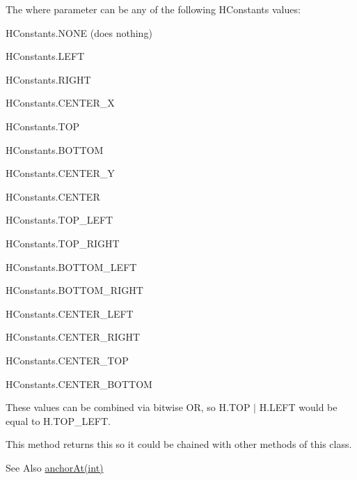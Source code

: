 The {\ttfamily where} parameter can be any of the following H\-Constants values\-:
\begin{DoxyItemize}
\item {\ttfamily H\-Constants.\-N\-O\-N\-E} (does nothing)
\item {\ttfamily H\-Constants.\-L\-E\-F\-T}
\item {\ttfamily H\-Constants.\-R\-I\-G\-H\-T}
\item {\ttfamily H\-Constants.\-C\-E\-N\-T\-E\-R\-\_\-\-X}
\item {\ttfamily H\-Constants.\-T\-O\-P}
\item {\ttfamily H\-Constants.\-B\-O\-T\-T\-O\-M}
\item {\ttfamily H\-Constants.\-C\-E\-N\-T\-E\-R\-\_\-\-Y}
\item {\ttfamily H\-Constants.\-C\-E\-N\-T\-E\-R}
\item {\ttfamily H\-Constants.\-T\-O\-P\-\_\-\-L\-E\-F\-T}
\item {\ttfamily H\-Constants.\-T\-O\-P\-\_\-\-R\-I\-G\-H\-T}
\item {\ttfamily H\-Constants.\-B\-O\-T\-T\-O\-M\-\_\-\-L\-E\-F\-T}
\item {\ttfamily H\-Constants.\-B\-O\-T\-T\-O\-M\-\_\-\-R\-I\-G\-H\-T}
\item {\ttfamily H\-Constants.\-C\-E\-N\-T\-E\-R\-\_\-\-L\-E\-F\-T}
\item {\ttfamily H\-Constants.\-C\-E\-N\-T\-E\-R\-\_\-\-R\-I\-G\-H\-T}
\item {\ttfamily H\-Constants.\-C\-E\-N\-T\-E\-R\-\_\-\-T\-O\-P}
\item {\ttfamily H\-Constants.\-C\-E\-N\-T\-E\-R\-\_\-\-B\-O\-T\-T\-O\-M}
\end{DoxyItemize}

These values can be combined via bitwise O\-R, so {\ttfamily H.\-T\-O\-P $|$ H.\-L\-E\-F\-T} would be equal to {\ttfamily H.\-T\-O\-P\-\_\-\-L\-E\-F\-T}.

This method returns {\ttfamily this} so it could be chained with other methods of this class. \begin{DoxySeeAlso}{See Also}
\hyperlink{classhype_1_1drawable_1_1_h_drawable_a6d95df0dfd78df98ac6036a30d73f411}{anchor\-At(int)} 
\end{DoxySeeAlso}

